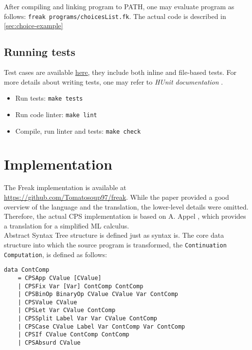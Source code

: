 \documentclass{article}
\theoremstyle{definition}
\theoremstyle{lemma}
\theoremstyle{observation}
\theoremstyle{theorem}
\newcommand*{\fullref}[1]{\hyperref[{#1}]{\autoref*{#1} \nameref*{#1}}}
\begin{document}
    After compiling and linking program to PATH, one may evaluate program as
    follows: \verb!freak programs/choicesList.fk!. The actual code is described in \fullref{sec:choice-example}

    \subsection{Running tests}

    Test cases are available \href{https://github.com/Tomatosoup97/freak/blob/master/src/Tests.hs}{\underline{here}},
    they include both inline and file-based tests. For more details about
    writing tests, one may refer to \textit{HUnit documentation} \cite{hunit-docs}. \\

    \begin{itemize}
        \item Run tests: \verb!make tests!
        \item Run code linter: \verb!make lint!
        \item Compile, run linter and tests: \verb!make check!
    \end{itemize}

\section{Implementation}

    The Freak implementation is available at \href{https://github.com/Tomatosoup97/freak}{https://github.com/Tomatosoup97/freak}.
    While the paper provided a good overview of the language and the translation,
    the lower-level details were omitted. Therefore, the actual CPS implementation
    is based on A. Appel \cite{appel-continuations}, which provides a translation
    for a simplified ML calculus. \\

    Abstract Syntax Tree structure is defined just as syntax is. The core data
    structure into which the source program is transformed,
    the \verb!Continuation Computation!, is defined as follows:

    \begin{verbatim}
data ContComp
    = CPSApp CValue [CValue]
    | CPSFix Var [Var] ContComp ContComp
    | CPSBinOp BinaryOp CValue CValue Var ContComp
    | CPSValue CValue
    | CPSLet Var CValue ContComp
    | CPSSplit Label Var Var CValue ContComp
    | CPSCase CValue Label Var ContComp Var ContComp
    | CPSIf CValue ContComp ContComp
    | CPSAbsurd CValue
    \end{verbatim}
\end{document}
